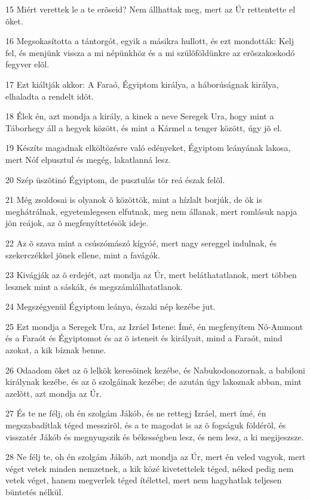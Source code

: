 \par 15 Miért verettek le a te erõseid? Nem állhattak meg, mert az Úr rettentette el õket.
\par 16 Megsokasította a tántorgót, egyik a másikra hullott, és ezt mondották: Kelj fel, és menjünk vissza a mi népünkhöz és a mi szülõföldünkre az erõszakoskodó fegyver elõl.
\par 17 Ezt kiáltják akkor: A Faraó, Égyiptom királya, a háborúságnak királya, elhaladta a rendelt idõt.
\par 18 Élek én, azt mondja a király, a kinek a neve Seregek Ura, hogy mint a Táborhegy áll a hegyek között, és mint a Kármel a tenger között, úgy jõ el.
\par 19 Készíts magadnak elköltözésre való edényeket, Égyiptom leányának lakosa, mert Nóf elpusztul és megég, lakatlanná lesz.
\par 20 Szép üszõtinó Égyiptom, de pusztulás tör reá észak felõl.
\par 21 Még zsoldosai is olyanok õ közöttök, mint a hízlalt borjúk, de õk is meghátrálnak, egyetemlegesen elfutnak, meg nem állanak, mert romlásuk napja jön reájok, az õ megfenyíttetésök ideje.
\par 22 Az õ szava mint a csúszómászó kígyóé, mert nagy sereggel indulnak, és szekerczékkel jõnek ellene, mint a favágók.
\par 23 Kivágják az õ erdejét, azt mondja az Úr, mert beláthatatlanok, mert többen lesznek mint a sáskák, és megszámlálhatatlanok.
\par 24 Megszégyenül Égyiptom leánya, északi nép kezébe jut.
\par 25 Ezt mondja a Seregek Ura, az Izráel Istene: Ímé, én megfenyítem Nó-Ammont és a Faraót és Égyiptomot és az õ isteneit és királyait, mind a Faraót, mind azokat, a kik bíznak benne.
\par 26 Odaadom õket az õ lelkök keresõinek kezébe, és Nabukodonozornak, a babiloni királynak kezébe, és az õ szolgáinak kezébe; de azután úgy lakoznak abban, mint azelõtt, azt mondja az Úr.
\par 27 És te ne félj, oh én szolgám Jákób, és ne rettegj Izráel, mert ímé, én megszabadítlak téged messzirõl, és a te magodat is az õ fogságuk földérõl, és visszatér Jákób és megnyugszik és békességben lesz, és nem lesz, a ki megijeszsze.
\par 28 Ne félj te, oh én szolgám Jákób, azt mondja az Úr, mert én veled vagyok, mert véget vetek minden nemzetnek, a kik közé kivetettelek téged, néked pedig nem vetek véget, hanem megverlek téged ítélettel, mert nem hagyhatlak teljesen büntetés nélkül.

